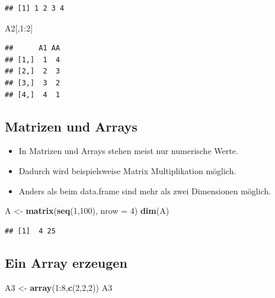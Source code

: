 \documentclass[]{article}
\newenvironment{Shaded}{\begin{snugshade}}{\end{snugshade}}
\newcommand{\KeywordTok}[1]{\textcolor[rgb]{0.13,0.29,0.53}{\textbf{{#1}}}}
\newcommand{\DataTypeTok}[1]{\textcolor[rgb]{0.13,0.29,0.53}{{#1}}}
\newcommand{\DecValTok}[1]{\textcolor[rgb]{0.00,0.00,0.81}{{#1}}}
\newcommand{\StringTok}[1]{\textcolor[rgb]{0.31,0.60,0.02}{{#1}}}
\newcommand{\NormalTok}[1]{{#1}}
\providecommand{\tightlist}{%
  \setlength{\itemsep}{0pt}\setlength{\parskip}{0pt}}
\begin{document}
\begin{verbatim}
## [1] 1 2 3 4
\end{verbatim}

\begin{Shaded}
\begin{Highlighting}[]
\NormalTok{A2[,}\DecValTok{1}\NormalTok{:}\DecValTok{2}\NormalTok{]}
\end{Highlighting}
\end{Shaded}

\begin{verbatim}
##      A1 AA
## [1,]  1  4
## [2,]  2  3
## [3,]  3  2
## [4,]  4  1
\end{verbatim}

\subsection{Matrizen und Arrays}\label{matrizen-und-arrays}

\begin{itemize}
\tightlist
\item
  In Matrizen und Arrays stehen meist nur numerische Werte.
\item
  Dadurch wird beispielsweise Matrix Multiplikation möglich.
\item
  Anders als beim data.frame sind mehr als zwei Dimensionen möglich.
\end{itemize}

\begin{Shaded}
\begin{Highlighting}[]
\NormalTok{A <-}\StringTok{ }\KeywordTok{matrix}\NormalTok{(}\KeywordTok{seq}\NormalTok{(}\DecValTok{1}\NormalTok{,}\DecValTok{100}\NormalTok{), }\DataTypeTok{nrow =} \DecValTok{4}\NormalTok{)}
\KeywordTok{dim}\NormalTok{(A)}
\end{Highlighting}
\end{Shaded}

\begin{verbatim}
## [1]  4 25
\end{verbatim}

\subsection{Ein Array erzeugen}\label{ein-array-erzeugen}

\begin{Shaded}
\begin{Highlighting}[]
\NormalTok{A3 <-}\StringTok{ }\KeywordTok{array}\NormalTok{(}\DecValTok{1}\NormalTok{:}\DecValTok{8}\NormalTok{,}\KeywordTok{c}\NormalTok{(}\DecValTok{2}\NormalTok{,}\DecValTok{2}\NormalTok{,}\DecValTok{2}\NormalTok{))}
\NormalTok{A3}
\end{Highlighting}
\end{Shaded}
\end{document}
